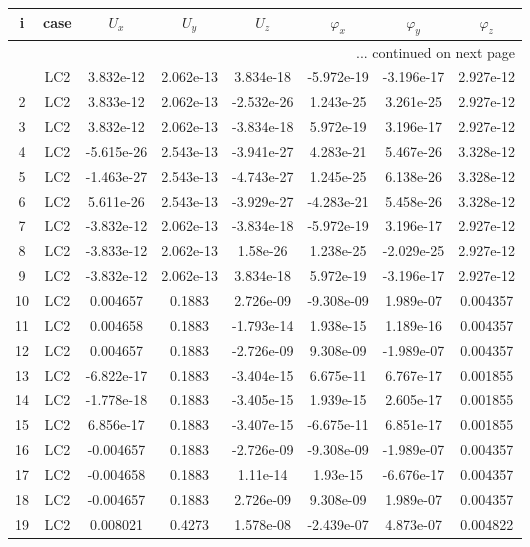 \documentclass{article}%
\begin{document}
\begin{longtable}{| c c | c c c c c c |}%
\hline%
i&case&$U_x$&$U_y$&$U_z$&$\varphi_x$&$\varphi_y$&$\varphi_z$\\%
\hline%
\endhead%
\hline%
\multicolumn{8}{r}{... continued on next page}\\%
\endfoot%
\hline%
\endlastfoot%
1&LC2&3.832e{-}12&2.062e{-}13&3.834e{-}18&{-}5.972e{-}19&{-}3.196e{-}17&2.927e{-}12\\%
2&LC2&3.833e{-}12&2.062e{-}13&{-}2.532e{-}26&1.243e{-}25&3.261e{-}25&2.927e{-}12\\%
3&LC2&3.832e{-}12&2.062e{-}13&{-}3.834e{-}18&5.972e{-}19&3.196e{-}17&2.927e{-}12\\%
4&LC2&{-}5.615e{-}26&2.543e{-}13&{-}3.941e{-}27&4.283e{-}21&5.467e{-}26&3.328e{-}12\\%
5&LC2&{-}1.463e{-}27&2.543e{-}13&{-}4.743e{-}27&1.245e{-}25&6.138e{-}26&3.328e{-}12\\%
6&LC2&5.611e{-}26&2.543e{-}13&{-}3.929e{-}27&{-}4.283e{-}21&5.458e{-}26&3.328e{-}12\\%
7&LC2&{-}3.832e{-}12&2.062e{-}13&{-}3.834e{-}18&{-}5.972e{-}19&3.196e{-}17&2.927e{-}12\\%
8&LC2&{-}3.833e{-}12&2.062e{-}13&1.58e{-}26&1.238e{-}25&{-}2.029e{-}25&2.927e{-}12\\%
9&LC2&{-}3.832e{-}12&2.062e{-}13&3.834e{-}18&5.972e{-}19&{-}3.196e{-}17&2.927e{-}12\\%
10&LC2&0.004657&0.1883&2.726e{-}09&{-}9.308e{-}09&1.989e{-}07&0.004357\\%
11&LC2&0.004658&0.1883&{-}1.793e{-}14&1.938e{-}15&1.189e{-}16&0.004357\\%
12&LC2&0.004657&0.1883&{-}2.726e{-}09&9.308e{-}09&{-}1.989e{-}07&0.004357\\%
13&LC2&{-}6.822e{-}17&0.1883&{-}3.404e{-}15&6.675e{-}11&6.767e{-}17&0.001855\\%
14&LC2&{-}1.778e{-}18&0.1883&{-}3.405e{-}15&1.939e{-}15&2.605e{-}17&0.001855\\%
15&LC2&6.856e{-}17&0.1883&{-}3.407e{-}15&{-}6.675e{-}11&6.851e{-}17&0.001855\\%
16&LC2&{-}0.004657&0.1883&{-}2.726e{-}09&{-}9.308e{-}09&{-}1.989e{-}07&0.004357\\%
17&LC2&{-}0.004658&0.1883&1.11e{-}14&1.93e{-}15&{-}6.676e{-}17&0.004357\\%
18&LC2&{-}0.004657&0.1883&2.726e{-}09&9.308e{-}09&1.989e{-}07&0.004357\\%
19&LC2&0.008021&0.4273&1.578e{-}08&{-}2.439e{-}07&4.873e{-}07&0.004822\\%

\end{longtable}
\end{document}
